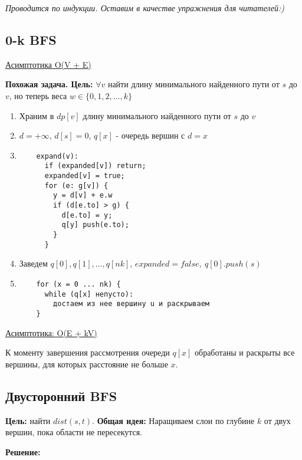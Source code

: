 \textit{Проводится по индукции. Оставим в качестве упражнения для читателей:)}

\subsection{0-k BFS}
\underline{Асимптотика O(V + E)}

\textbf{Похожая задача. Цель:} $\forall v$ найти длину минимального найденного пути от $s$ до $v$, но теперь веса $w \in \{0, 1, 2, \dots, k\}$

\begin{enumerate}
  \item Храним в $dp[v]$ длину минимального найденного пути от $s$ до $v$
  \item $d = +\infty$, $d[s] = 0$, $q[x]$ - очередь вершин с $d = x$
  \newpage
  \item
  \begin{center}
 \begin{verbatim}
    expand(v):
      if (expanded[v]) return;
      expanded[v] = true;
      for (e: g[v]) {
        y = d[v] + e.w
        if (d[e.to] > g) {
          d[e.to] = y;
          q[y] push(e.to);
        }
      } 
  \end{verbatim}
\end{center}
  \item Заведем $q[0], q[1], \dots, q[nk]$, $expanded = false, \ q[0].push(s)$
  
  \item \begin{verbatim}
    for (x = 0 ... nk) {
      while (q[x] непусто):
        достаем из нее вершину u и раскрываем
    }
  \end{verbatim}  
\end{enumerate}

\underline{Асимптотика: O(E + kV)}

\begin{exercise}
К моменту завершения рассмотрения очереди $q[x]$ обработаны и раскрыты все вершины, для которых расстояние не больше $x$.
\end{exercise}

\subsection{Двусторонний BFS}
\textbf{Цель:} найти $dist(s, t)$. \textbf{Общая идея:} Наращиваем слои по глубине $k$ от двух вершин, пока области не пересекутся.

\textbf{Решение:}

